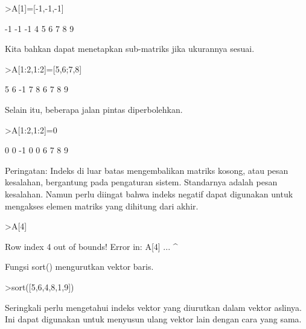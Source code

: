 \begin{eulernotebook}
\begin{eulercomment}
\begin{eulercomment}
\begin{eulercomment}
\end{eulercomment}
\begin{eulerprompt}
>A[1]=[-1,-1,-1]
\end{eulerprompt}
\begin{euleroutput}
             -1            -1            -1 
              4             5             6 
              7             8             9 
\end{euleroutput}
\begin{eulercomment}
Kita bahkan dapat menetapkan sub-matriks jika ukurannya sesuai.
\end{eulercomment}
\begin{eulerprompt}
>A[1:2,1:2]=[5,6;7,8]
\end{eulerprompt}
\begin{euleroutput}
              5             6            -1 
              7             8             6 
              7             8             9 
\end{euleroutput}
\begin{eulercomment}
Selain itu, beberapa jalan pintas diperbolehkan.
\end{eulercomment}
\begin{eulerprompt}
>A[1:2,1:2]=0
\end{eulerprompt}
\begin{euleroutput}
              0             0            -1 
              0             0             6 
              7             8             9 
\end{euleroutput}
\begin{eulercomment}
Peringatan: Indeks di luar batas mengembalikan matriks kosong, atau
pesan kesalahan, bergantung pada pengaturan sistem. Standarnya adalah
pesan kesalahan. Namun perlu diingat bahwa indeks negatif dapat
digunakan untuk mengakses elemen matriks yang dihitung dari akhir.
\end{eulercomment}
\begin{eulerprompt}
>A[4]
\end{eulerprompt}
\begin{euleroutput}
  Row index 4 out of bounds!
  Error in:
  A[4] ...
      ^
      \\
\end{euleroutput}
\begin{eulercomment}
Fungsi sort() mengurutkan vektor baris.
\end{eulercomment}
\begin{eulerprompt}
>sort([5,6,4,8,1,9])
\end{eulerprompt}
\begin{euleroutput}
  [1,  4,  5,  6,  8,  9]
\end{euleroutput}
\begin{eulercomment}
Seringkali perlu mengetahui indeks vektor yang diurutkan dalam vektor
aslinya. Ini dapat digunakan untuk menyusun ulang vektor lain dengan
cara yang sama.


\end{eulercomment}
\end{eulercomment}
\end{eulercomment}
\end{eulernotebook}
